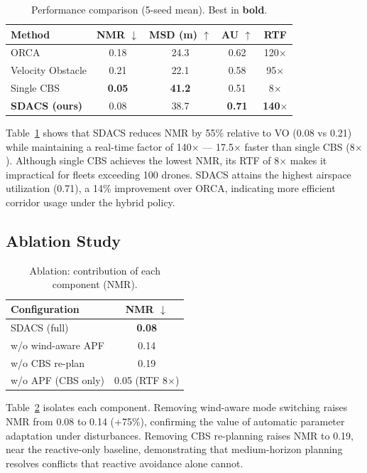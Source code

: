 \begin{table}[t]
\caption{Performance comparison (5-seed mean). Best in \textbf{bold}.}
\label{tab:results}
\centering
\begin{tabular}{lcccc}
\hline
Method & NMR $\downarrow$ & MSD (m) $\uparrow$ & AU $\uparrow$ & RTF \\
\hline
ORCA              & 0.18 & 24.3 & 0.62 & 120$\times$ \\
Velocity Obstacle & 0.21 & 22.1 & 0.58 & 95$\times$ \\
Single CBS        & \textbf{0.05} & \textbf{41.2} & 0.51 & 8$\times$ \\
\textbf{SDACS (ours)} & 0.08 & 38.7 & \textbf{0.71} & \textbf{140$\times$} \\
\hline
\end{tabular}
\end{table}

Table~\ref{tab:results} shows that SDACS reduces NMR by 55\% relative
to VO (0.08 vs 0.21) while maintaining a real-time factor of
140$\times$ --- 17.5$\times$ faster than single CBS (8$\times$).
Although single CBS achieves the lowest NMR, its RTF of 8$\times$
makes it impractical for fleets exceeding 100 drones. SDACS attains
the highest airspace utilization (0.71), a 14\% improvement over ORCA,
indicating more efficient corridor usage under the hybrid policy.

\subsection{Ablation Study}

\begin{table}[t]
\caption{Ablation: contribution of each component (NMR).}
\label{tab:ablation}
\centering
\begin{tabular}{lc}
\hline
Configuration & NMR $\downarrow$ \\
\hline
SDACS (full)             & \textbf{0.08} \\
\quad w/o wind-aware APF & 0.14 \\
\quad w/o CBS re-plan    & 0.19 \\
\quad w/o APF (CBS only) & 0.05 (RTF 8$\times$) \\
\hline
\end{tabular}
\end{table}

Table~\ref{tab:ablation} isolates each component. Removing wind-aware
mode switching raises NMR from 0.08 to 0.14 (+75\%), confirming the
value of automatic parameter adaptation under disturbances. Removing
CBS re-planning raises NMR to 0.19, near the reactive-only baseline,
demonstrating that medium-horizon planning resolves conflicts that
reactive avoidance alone cannot.


